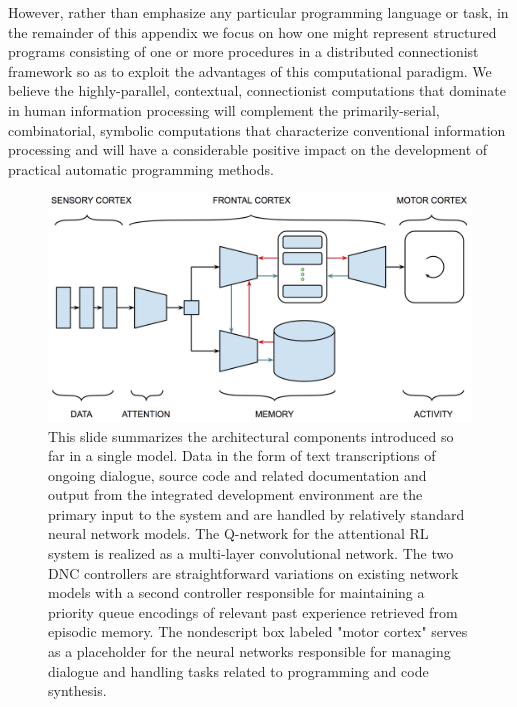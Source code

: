 However, rather than emphasize any particular programming language or task, in the remainder of this appendix we focus on how one might represent structured programs consisting of one or more procedures in a distributed connectionist framework so as to exploit the advantages of this computational paradigm. We believe the highly-parallel, contextual, connectionist computations that dominate in human information processing will complement the primarily-serial, combinatorial, symbolic computations that characterize conventional information processing and will have a considerable positive impact on the development of practical automatic programming methods.


\begin{figure}
%
  \begin{center} 
    \includegraphics[width=375pt]{./figures/High_Level_Assistant_Architecture.png} %
  \end{center}
%
  \caption{This slide summarizes the architectural components introduced so far in a single model. Data in the form of text transcriptions of ongoing dialogue, source code and related documentation and output from the integrated development environment are the primary input to the system and are handled by relatively standard neural network models. The Q-network for the attentional RL system is realized as a multi-layer convolutional network. The two DNC controllers are straightforward variations on existing network models with a second controller responsible for maintaining a priority queue encodings of relevant past experience retrieved from episodic memory. The nondescript box labeled "motor cortex" serves as a placeholder for the neural networks responsible for managing dialogue and handling tasks related to programming and code synthesis.}
%
  \label{fig_High_Level_Assistant_Architecture}
%
\end{figure}

